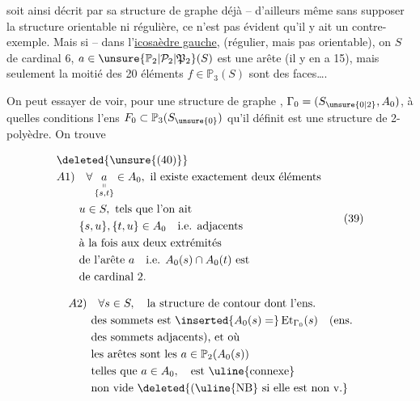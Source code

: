 
soit ainsi décrit par sa structure de graphe déjà -- d'ailleurs même sans supposer la structure orientable ni régulière, ce n'est pas évident qu'il y ait un contre-exemple.  Mais si -- dans l'\uline{icosaèdre gauche}, (régulier, mais pas orientable), on  $S$ de cardinal 6,   $a\in\unsure{\mathbb P_2|\mathcal P_2|\mathfrak P_2}(S)$ est une arête (il y en a 15), mais seulement la moitié des 20 éléments $f\in\mathbb P_3(S)$ sont des faces\ldots.


On peut essayer de voir, pour une structure de graphe , $\Gamma_0=(S_{\unsure{0|2}},A_0)$, à quelles conditions l'ens $F_0\subset\mathbb P_3(S_{\unsure{0}})$ qu'il  définit est une structure de 2-polyèdre. On trouve 

\[
\begin{aligned}
&\deleted{\unsure{(40)}}\\
&A1)\quad \forall\,\underset{\substack{\shortparallel\\\{s,t\}}}{a}\in A_0,\ 
 \text{il existe exactement deux éléments}\\
&\qquad u\in S,\ \text{tels que l'on ait}\\
&\qquad \{s,u\},\{t,u\}\in A_0\quad \text{i.e. adjacents}\\
&\qquad \text{à la fois aux deux extrémités}\\
&\qquad \text{de l'arête }a\quad\text{i.e. }A_0(s)\cap A_0(t)\text{ est}\\
&\qquad \text{de cardinal }2.
\end{aligned}\tag*{$(39)$}
\]


\[
\begin{aligned}
&A2)\quad \forall s\in S,\quad\text{la structure de contour dont l'ens.}\\
&\qquad\text{des sommets est }\inserted{A_0(s)=}\operatorname{Et}_{\Gamma_0}(s)\quad\text{(ens.}\\
&\qquad\text{des sommets adjacents), et où}\\
&\qquad\text{les arêtes sont les } a\in\mathbb P_2(A_0(s))\\
&\qquad\text{telles que }a\in A_0,\quad\text{est \uline{connexe}}\\
&\qquad\text{non vide \deleted{(\uline{NB} si elle est non v.}}
\end{aligned}
\]

